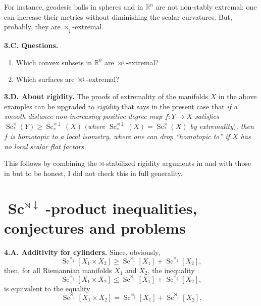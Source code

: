 \documentclass[pdftex]{sigma}
\numberwithin{equation}{section}
\begin{document}
 For instance,
 geodesic balls in spheres and in $\mathbb R^n$ are not non-stably extremal:
 one can increase their metrics without diminishing the scalar curvatures. But,
probably, they are
 $\rtimes_\downarrow$-extremal.

 \textbf{3.C. Questions.}
 \begin{enumerate}\itemsep=0pt
 \item[(i)] Which convex subsets in $\mathbb R^n$ are $\rtimes^\downarrow$-extremal?
\item[(ii)] Which surfaces are $\rtimes^\downarrow$-extremal?
\end{enumerate}

\textbf{3.D. About rigidity.}
 The proofs of extremality of the manifolds $X$ in the above examples can be upgraded to {\it rigidity} that says in the present case that
 {\it if a smooth distance non-increasing positive degree map $f\colon Y\to X$ satisfies
 $\operatorname{Sc}_\ast^\rtimes(Y)\geq \operatorname{Sc}_\ast^{\rtimes\downarrow}(X)$ $($where $ \operatorname{Sc}_\ast^{\rtimes\downarrow}(X)=\operatorname{Sc}_\ast^\rtimes(X)$ by extremality$)$, then $f$ is homotopic to a local isometry, where one
 can drop ``homotopic to''
 if $X$ has no local scalar flat factors.}

This follows by combining the $\rtimes$-stabilized rigidity arguments in \cite{GS2002} and \cite{Li2010} with those in \cite[\S5.7]{Gr2021}
but to be honest, I did not check this in full generality.

 \section[Sc\^{}\{rtimes downarrow\}-product inequalities, conjectures and problems]{$\boldsymbol{\operatorname{Sc}^{\rtimes\downarrow}}$-product inequalities, conjectures and problems}\label{section4}

 \textbf{4.A. Additivity for cylinders.} Since, obviously,
\[
\operatorname{Sc}^{\rtimes_\downarrow}[X_1\times X_2]\geq \operatorname{Sc}^{\rtimes_\downarrow}[X_1]+\operatorname{Sc}^{\rtimes_\downarrow}[X_2],
\]
then, for all Riemannian manifolds $X_1$ and $X_2$, the inequality
\[
\operatorname{Sc}^{\rtimes_\downarrow}[X_1\times X_2]\leq \operatorname{Sc}^{\rtimes_\downarrow}[X_1]+\operatorname{Sc}^{\rtimes_\downarrow}[X_2],
\]
 is equivalent to the equality
\[
\operatorname{Sc}^{\rtimes_\downarrow}[X_1\times X_2]= \operatorname{Sc}^{\rtimes_\downarrow}[X_1]+\operatorname{Sc}^{\rtimes_\downarrow}[X_2].
\]
\end{document}
